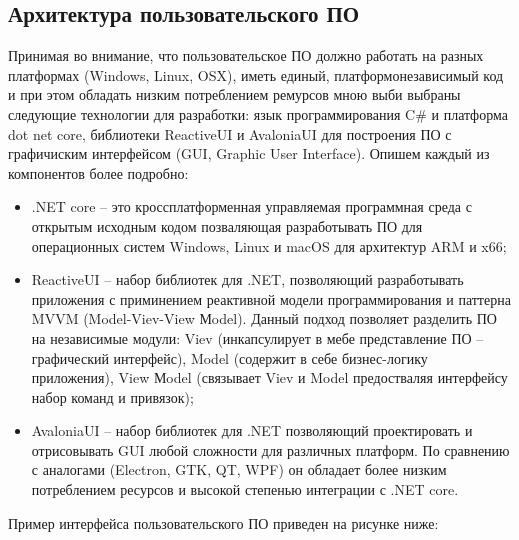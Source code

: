 \subsection{Архитектура пользовательского ПО}
Принимая во внимание, что пользовательское ПО должно работать на разных платформах (Windows, Linux, OSX), иметь единый, платформонезависимый код и при этом обладать низким потреблением ремурсов мною выби выбраны следующие технологии для разработки: язык программирования C\# и платформа dot net core, библиотеки ReactiveUI и AvaloniaUI для построения ПО с графичиским интерфейсом (GUI, Graphic User Interface). Опишем каждый из компонентов более подробно:

\begin{itemize}
    \item .NET core -- это кроссплатформенная управляемая программная среда с открытым исходным кодом позваляющая разработывать ПО для операционных систем Windows, Linux и macOS для архитектур ARM и x66;
    \item ReactiveUI -- набор библиотек для .NET, позволяющий разработывать приложения с приминением реактивной модели программирования и паттерна MVVM (Model-Viev-View Мodel). Данный подход позволяет разделить ПО на независимые модули: Viev (инкапсулирует в мебе представление ПО -- графический интерфейс), Model (содержит в себе бизнес-логику приложения), View Мodel (связывает Viev и Model предостваляя интерфейсу набор команд и привязок);
    \item AvaloniaUI -- набор библиотек для .NET позволяющий проектировать и отрисовывать GUI любой сложности для различных платформ. По сравнению с аналогами (Electron, GTK, QT, WPF) он обладает более низким потреблением ресурсов и высокой степенью интеграции с .NET core.
\end{itemize}

Пример интерфейса пользовательского ПО приведен на рисунке ниже:


